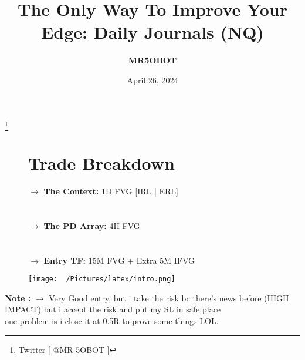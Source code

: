 \documentclass{article}
\title{The Only Way To Improve Your Edge: Daily Journals (NQ)}
\author{\textbf{MR5OBOT}}
\date{April 26, 2024}
\begin{document}
\maketitle




\renewcommand{\thefootnote}{}
\footnote{Twitter [ @MR-5OBOT ]}

\renewcommand{\arraystretch}{1.5} %
\setlength{\tabcolsep}{10pt} %


\begin{figure}[htbp!]
\begin{minipage}{0.6\textwidth}
\section*{Trade Breakdown}
\vspace{0.3cm}


$\rightarrow$ \textbf{The Context:}  1D FVG [IRL | ERL]  \\\\\\
$\rightarrow$ \textbf{The PD Array:} 4H FVG  \\\\\\
$\rightarrow$ \textbf{Entry TF:} 15M FVG + Extra 5M IFVG
\vspace{0.8cm}


\end{minipage}
\begin{minipage}{0.35\textwidth}
  \texttt{[image: ~/Pictures/latex/intro.png]}
  \label{fig:image}
\end{minipage}
\end{figure}


\begin{center}
\begin{mdframed}[style=MyQuoteFrame]
  \textbf{Note :} $\rightarrow$ Very Good entry, but i take the risk bc there's news before (HIGH IMPACT) but i accept the risk and put my SL in safe place \\
  one problem is i close it at 0.5R to prove some things LOL.
\end{mdframed}
\end{center}
\end{document}
